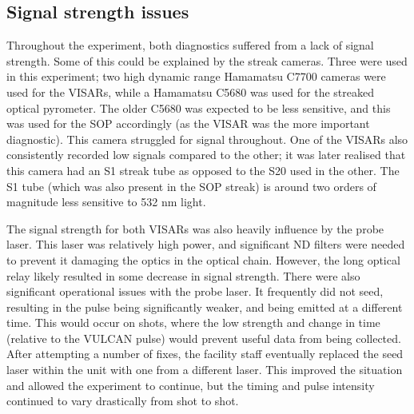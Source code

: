 \subsection{Signal strength issues}

Throughout the experiment, both diagnostics suffered from a lack of signal strength. Some of this could be explained by the streak cameras. Three were used in this experiment; two high dynamic range Hamamatsu C7700 cameras were used for the VISARs, while a Hamamatsu C5680 was used for the streaked optical pyrometer. The older C5680 was expected to be less sensitive, and this was used for the SOP accordingly (as the VISAR was the more important diagnostic). This camera struggled for signal throughout. One of the VISARs also consistently recorded low signals compared to the other; it was later realised that this camera had an S1 streak tube as opposed to the S20 used in the other. The S1 tube (which was also present in the SOP streak) is around two orders of magnitude less sensitive to 532 \unit{\nano\meter} light.

The signal strength for both VISARs was also heavily influence by the probe laser. This laser was relatively high power, and significant ND filters were needed to prevent it damaging the optics in the optical chain. However, the long optical relay likely resulted in some decrease in signal strength. There were also significant operational issues with the probe laser. It frequently did not seed, resulting in the pulse being significantly weaker, and being emitted at a different time. This would occur on shots, where the low strength and change in time (relative to the VULCAN pulse) would prevent useful data from being collected. After attempting a number of fixes, the facility staff eventually replaced the seed laser within the unit with one from a different laser. This improved the situation and allowed the experiment to continue, but the timing and pulse intensity continued to vary drastically from shot to shot.


